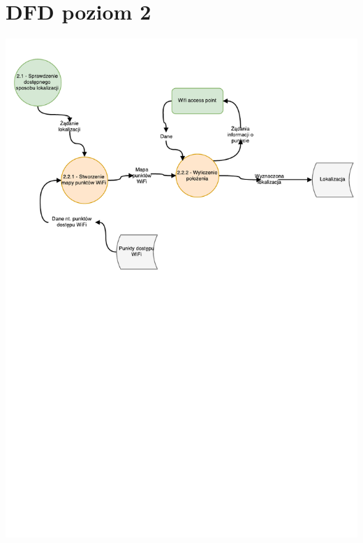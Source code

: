 \documentclass[11pt]{article}
\begin{document}
	\section{DFD poziom 2}
	\begin{center}
		\includegraphics[scale=0.8]{DFD22.pdf}
	\end{center}
	\newpage
\end{document}
